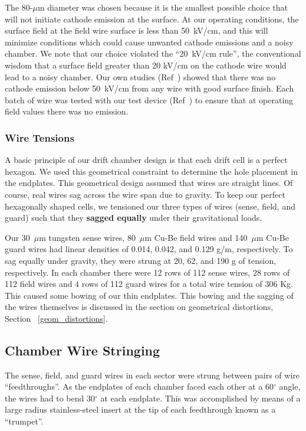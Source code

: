 The 80-$\mu$m diameter was chosen because it is the smallest possible choice
that will not initiate cathode emission at the surface.
At our operating conditions, the surface field at the field wire
surface is less than 50~kV/cm, and this will minimize 
conditions which could cause unwanted cathode emissions and a noisy chamber.  
We note that
our choice violated the ``20~kV/cm rule'', the conventional wisdom that
a surface field greater than 20 kV/cm on the cathode wire would lead to 
a noisy chamber.
Our own studies (Ref~\cite{cathode-emission}) showed that there was no cathode
emission below 50~kV/cm from any wire with good surface finish.  Each batch
of wire was tested with our test device (Ref~\cite{patent}) to ensure that at operating field 
values there was no emission.  

\subsubsection{Wire Tensions}
A basic principle of our drift chamber design is that each drift cell is a perfect hexagon.
We used this geometrical constraint to determine the hole placement in the endplates.
This geometrical design assumed that wires are straight lines.  Of course, real wires
sag across the wire span due to gravity.  To keep our perfect hexagonally shaped cells,
we tensioned our three types of wires (sense, field, and guard) such that they
{\bf sagged equally} under their gravitational loads.

Our 30~$\mu$m tungsten sense wires, 80~$\mu$m Cu-Be field wires and 140~$\mu$m Cu-Be guard
wires had linear densities of 0.014, 0.042, and 0.129 g/m, respectively.  To sag equally
under gravity, they were strung at 20, 62, and 190 g of tension, respectively.
In each chamber there were 12 rows of 112 sense wires, 28 rows of 112 field wires
and 4 rows of 112 guard wires for a total wire tension of 306 Kg.
This caused some bowing of our thin endplates.  This bowing and the sagging
of the wires themselves is discussed in the section on geometrical distortions,
Section ~\ref{geom_distortions}.


\subsection{Chamber Wire Stringing}
The sense, field, 
and guard wires in each 
sector were strung between pairs of wire ``feedthroughs''.  As the endplates of 
each chamber faced each other at a 60$^{\circ}$ angle, the wires had to bend 
30$^{\circ}$ at each endplate.  This was accomplished by means of a large radius 
stainless-steel insert at the tip of each feedthrough known as a ``trumpet''.

